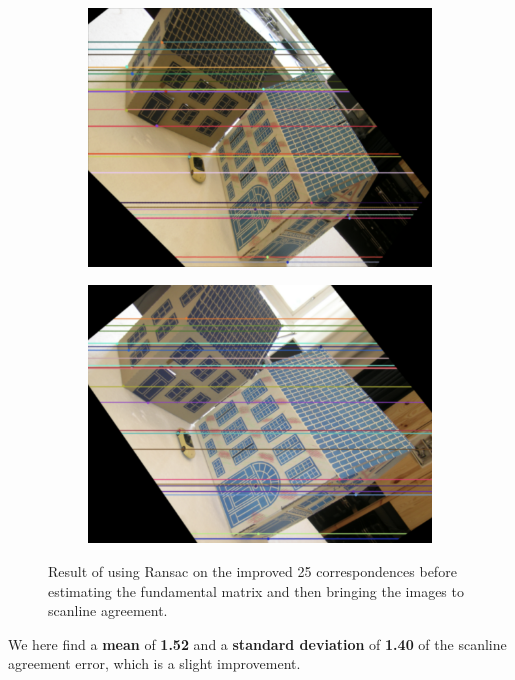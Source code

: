 \begin{figure}[h]
	\centering
	\begin{subfigure}{0.48\linewidth}
		\centering
		\includegraphics[width=\linewidth]{Materials/ImprovedARansac}
	\end{subfigure}
	\begin{subfigure}{0.48\linewidth}
		\centering
		\includegraphics[width=\linewidth]{Materials/ImprovedBRansac}
	\end{subfigure}
	\caption{Result of using Ransac on the improved 25 correspondences before estimating the fundamental matrix and then bringing the images to scanline agreement.}
	\label{ImprovedRansac}
\end{figure}
We here find a \textbf{mean} of \textbf{1.52} and a \textbf{standard deviation} of \textbf{1.40} of the scanline agreement error, which is a slight improvement.

